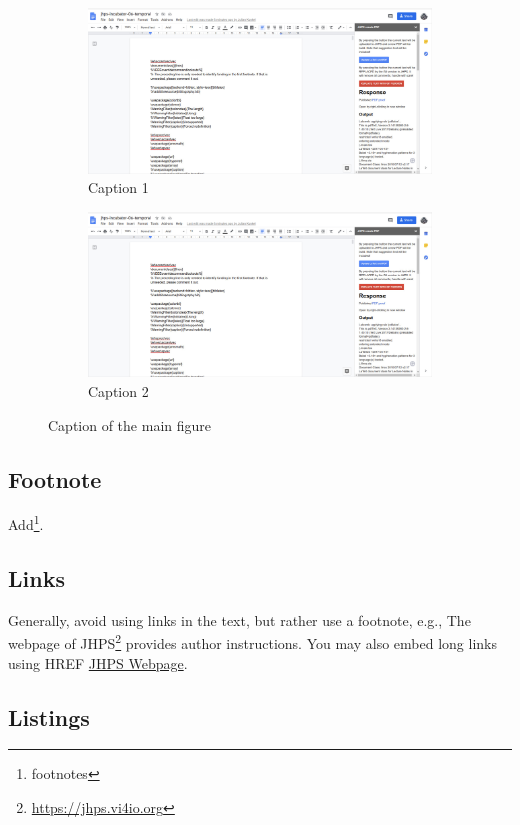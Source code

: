 \documentclass{jhps}
\begin{document}
\begin{figure}
  \begin{subfigure}[t]{3cm}
  \includegraphics[width=\textwidth]{jhps}
  \caption{Caption 1}\label{fig:1a}
  \end{subfigure}
  \quad
  \begin{subfigure}[t]{3cm}
  \includegraphics[width=\textwidth]{jhps}
  \caption{Caption 2}\label{fig:1b}
  \end{subfigure}
  \caption{Caption of the main figure}\label{fig:1}
\end{figure}

\subsection{Footnote}
Add\footnote{footnotes}.

\subsection{Links}
Generally, avoid using links in the text, but rather use a footnote, e.g.,
The webpage of JHPS\footnote{\url{https://jhps.vi4io.org}} provides author instructions.
You may also embed long links using HREF \href{https://jhps.vi4io.org}{JHPS Webpage}.

\subsection{Listings}
\end{document}
